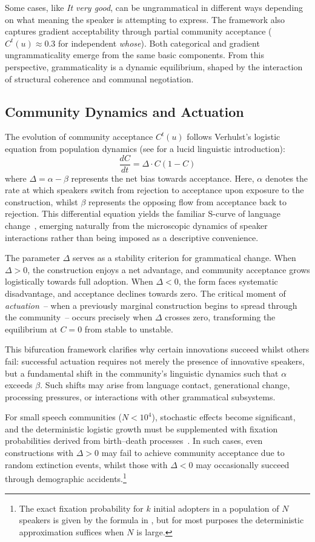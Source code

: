 Some cases, like \textit{It very good}, can be ungrammatical in different ways depending on what meaning the speaker is attempting to express. The framework also captures gradient acceptability through partial community acceptance (\(C^t(u) \approx 0.3\) for independent \textit{whose}). Both categorical and gradient ungrammaticality emerge from the same basic components. From this perspective, grammaticality is a dynamic equilibrium, shaped by the interaction of structural coherence and communal negotiation.

\subsection{Community Dynamics and Actuation}

The evolution of community acceptance $C^t(u)$ follows Verhulst's logistic equation from population dynamics (see \textcite{kauhanen2025} for a lucid linguistic introduction):
\[
\frac{dC}{dt} = \Delta \cdot C(1 - C)
\]
where $\Delta = \alpha - \beta$ represents the net bias towards acceptance. Here, $\alpha$ denotes the rate at which speakers switch from rejection to acceptance upon exposure to the construction, whilst $\beta$ represents the opposing flow from acceptance back to rejection. This differential equation yields the familiar S-curve of language change~\autocite{kroch1989}, emerging naturally from the microscopic dynamics of speaker interactions rather than being imposed as a descriptive convenience.

The parameter $\Delta$ serves as a stability criterion for grammatical change. When $\Delta > 0$, the construction enjoys a net advantage, and community acceptance grows logistically towards full adoption. When $\Delta < 0$, the form faces systematic disadvantage, and acceptance declines towards zero. The critical moment of \textit{actuation}~-- when a previously marginal construction begins to spread through the community~-- occurs precisely when $\Delta$ crosses zero, transforming the equilibrium at $C = 0$ from stable to unstable.

This bifurcation framework clarifies why certain innovations succeed whilst others fail: successful actuation requires not merely the presence of innovative speakers, but a fundamental shift in the community's linguistic dynamics such that $\alpha$ exceeds $\beta$. Such shifts may arise from language contact, generational change, processing pressures, or interactions with other grammatical subsystems.

For small speech communities ($N < 10^4$), stochastic effects become significant, and the deterministic logistic growth must be supplemented with fixation probabilities derived from birth--death processes~\autocite{kauhanen2022,nowak2006}. In such cases, even constructions with $\Delta > 0$ may fail to achieve community acceptance due to random extinction events, whilst those with $\Delta < 0$ may occasionally succeed through demographic accidents.\footnote{The exact fixation probability for $k$ initial adopters in a population of $N$ speakers is given by the formula in \textcite{nowak2006}, but for most purposes the deterministic approximation suffices when $N$ is large.}

